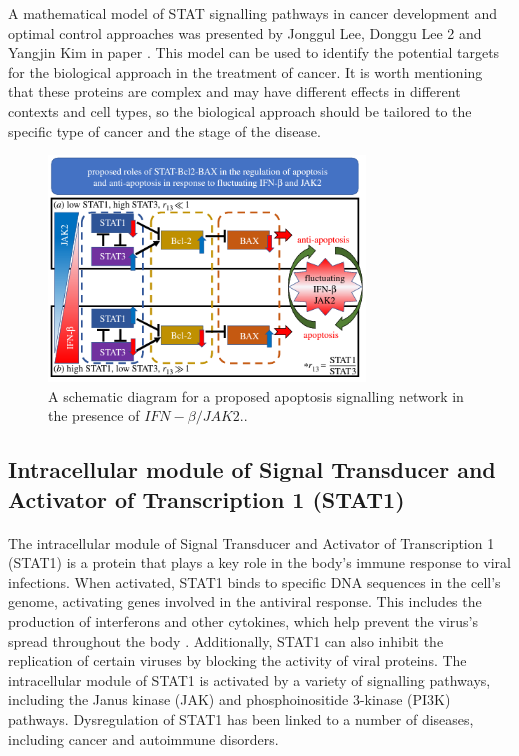 A mathematical model of STAT signalling pathways in cancer development and optimal control approaches was presented by Jonggul Lee, Donggu Lee 2 and Yangjin Kim in paper \cite{lee2021mathematical}. This model can be used to identify the potential targets for the biological approach in the treatment of cancer. It is worth mentioning that these proteins are complex and may have different effects in different contexts and cell types, so the biological approach should be tailored to the specific type of cancer and the stage of the disease. 

 \begin{figure}[hbt!]
	\centering
	\begin{framed}
	\includegraphics[width=0.75\textwidth]{Figures/stat.PNG}
		\end{framed}
	\caption{A schematic diagram for a proposed apoptosis signalling network in the presence of $IFN-\beta/JAK2$.\cite{lee2021mathematical}.}
	\label{fig:6}
\end{figure}

 
\subsection{Intracellular module of Signal Transducer and Activator of Transcription 1 (STAT1)}
\paragraph{}

The intracellular module of Signal Transducer and Activator of Transcription 1 (STAT1) is a protein that plays a key role in the body's immune response to viral infections. When activated, STAT1 binds to specific DNA sequences in the cell's genome, activating genes involved in the antiviral response. This includes the production of interferons and other cytokines, which help prevent the virus's spread throughout the body \cite{yang2021integrated}. Additionally, STAT1 can also inhibit the replication of certain viruses by blocking the activity of viral proteins. The intracellular module of STAT1 is activated by a variety of signalling pathways, including the Janus kinase (JAK) and phosphoinositide 3-kinase (PI3K) pathways. Dysregulation of STAT1 has been linked to a number of diseases, including cancer and autoimmune disorders. 

